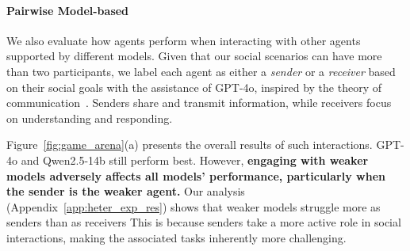 \paragraph{Pairwise Model-based}
We also evaluate how agents perform when interacting with other agents supported by different models.
Given that our social scenarios can have more than two participants, we label each agent as either a \emph{sender} or a \emph{receiver} based on their social goals with the assistance of GPT-4o, inspired by the theory of communication~\cite{blau1964exchange,barnlund2017transactional}.
Senders share and transmit information, while receivers focus on understanding and responding.

Figure~\ref{fig:game_arena}(a) presents the overall results of such interactions.
GPT-4o and Qwen2.5-14b still perform best. However, \textbf{engaging with weaker models adversely affects all models' performance, particularly when the sender is the weaker agent.}
Our analysis (Appendix~\ref{app:heter_exp_res}) shows that weaker models struggle more as senders than as receivers This is because senders take a more active role in social interactions, making the associated tasks inherently more challenging.